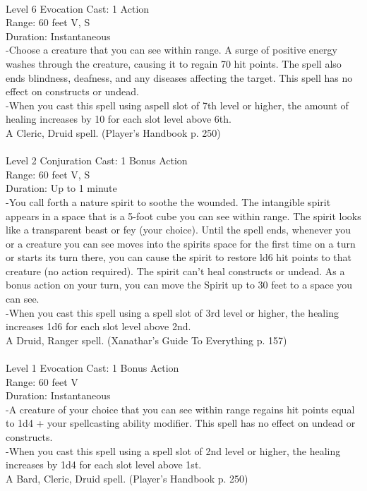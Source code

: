 \documentclass[10pt,twocolumn]{report}
\begin{document}
 \\
Level 6 \quad Evocation \quad Cast: 1 Action\\
Range: 60 feet \quad V, S\\
Duration: Instantaneous \quad \\
-Choose a creature that you can see within range. A surge of positive energy washes through the creature, causing it to regain 70 hit points. The spell also ends blindness, deafness, and any diseases affecting the target. This spell has no effect on constructs or undead.\\
-When you cast this spell using aspell slot of 7th level or higher, the amount of healing increases by 10 for each slot level above 6th.\\
A Cleric, Druid spell. (Player's Handbook p. 250) \\


 \\
Level 2 \quad Conjuration \quad Cast: 1 Bonus Action\\
Range: 60 feet \quad V, S\\
Duration: Up to 1 minute \quad \\
-You call forth a nature spirit to soothe the wounded. The intangible spirit appears in a space that is a 5-foot cube you can see within range. The spirit looks like a transparent beast or fey (your choice). Until the spell ends, whenever you or a creature you can see moves into the spirits space for the first time on a turn or starts its turn there, you can cause the spirit to restore ld6 hit points to that creature (no action required). The spirit can’t heal constructs or undead. As a bonus action on your turn, you can move the Spirit up to 30 feet to a space you can see.\\
-When you cast this spell using a spell slot of 3rd level or higher, the healing increases 1d6 for each slot level above 2nd.\\
A Druid, Ranger spell. (Xanathar's Guide To Everything p. 157) \\


 \\
Level 1 \quad Evocation \quad Cast: 1 Bonus Action\\
Range: 60 feet \quad V\\
Duration: Instantaneous \quad \\
-A creature of your choice that you can see within range regains hit points equal to 1d4 + your spellcasting ability modifier.
This spell has no effect on undead or constructs.\\
-When you cast this spell using a spell slot of 2nd level or higher, the healing increases by 1d4 for each slot level above 1st.\\
A Bard, Cleric, Druid spell. (Player's Handbook p. 250) \\
\end{document}
